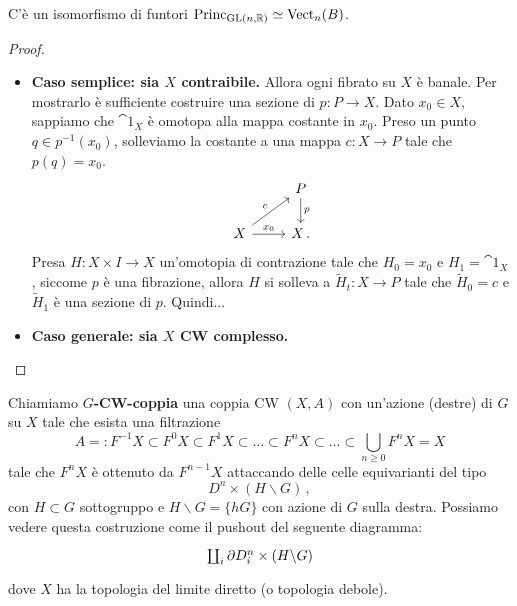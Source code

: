 




\begin{thm}
	C'è un isomorfismo di funtori $\mathrm{Princ}_{\mathrm{GL}(n,{\mathbb R})} \simeq \mathrm{Vect}_{n}(B)$.
	\begin{proof}
		\begin{itemize}
			\item \textbf{Caso semplice: sia $X$ contraibile.} Allora ogni fibrato su $X$ è banale.
			Per mostrarlo è sufficiente costruire una sezione di $p:P \to X$.
			Dato $x_{0} \in X$, sappiamo che $\cat{1}_{X}$ è omotopa alla mappa costante in $x_{0}$.
			Preso un punto $q \in p^{-1}(x_{0})$, solleviamo la costante a una mappa $c:X \to P$
			tale che $p(q)=x_{0}$.
			\begin{equation*}
				\begin{tikzcd}
					& P \ar[d, "p"] \\
					X \ar[r, "x_{0}"] \ar[ur, "c"] & X\,.
				\end{tikzcd}
			\end{equation*}
			Presa $H: X \times I \to X$ un'omotopia di contrazione tale che
			 $H_{0} = x_{0}$ e $H_{1} = \cat{1}_{X}$, 
			 siccome $p$ è una fibrazione, 
			 allora $H$ si solleva a $\widetilde{H}_{t} : X \to P$ tale
			 che $\widetilde{H}_{0}=c$ e $\widetilde{H}_{1}$ è una sezione di $p$.
			 Quindi...
			 
			 \item \textbf{Caso generale: sia $X$ CW complesso.}
		\end{itemize}
	\end{proof}
\end{thm}

\begin{df}
	Chiamiamo \textbf{$G$-CW-coppia} una coppia CW $(X,A)$ 
	con un'azione (destre) di $G$ su $X$ tale che esista una filtrazione
	\begin{equation*}
		A =: F^{-1}X \subset F^{0}X \subset F^{1}X \subset \dots  
		\subset F^{n}X \subset \dots
		\subset \bigcup_{n \ge 0} F^{n}X = X
	\end{equation*}
	tale che $F^{n}X$ è ottenuto da $F^{n-1}X$ attaccando delle celle equivarianti del tipo
	\begin{equation*}
		D^{n} \times \left( H \backslash G \right)\,,
	\end{equation*}
	con $H \subset G$ sottogruppo e $H \backslash G = \{hG\}$ con azione di $G$ sulla destra.
	Possiamo vedere questa costruzione come il pushout del seguente diagramma:
	\begin{equation*}
	 	\begin{tikzcd}
	 		\coprod_{i} \de D_{i}^{n} \times \left( H \backslash G \right)
	 	\end{tikzcd}
	 \end{equation*}
	 dove $X$ ha la topologia del limite diretto (o topologia debole). 
\end{df}


